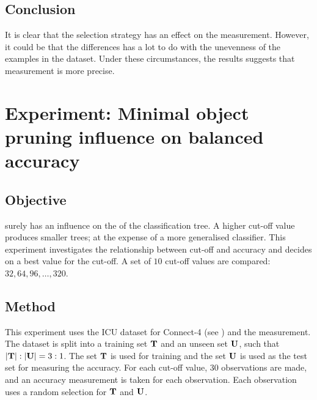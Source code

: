
\subsection{Conclusion}
It is clear that the selection strategy has an effect on the measurement.  However, it could be that the differences has a lot to do with the unevenness of the examples in the dataset. Under these circumstances, the results suggests that  measurement is more precise.   

\section{Experiment: Minimal object pruning influence on balanced accuracy}
\subsection{Objective}
 surely has an influence on the  of the classification tree.    A higher cut-off value produces smaller trees; at the expense of a more generalised classifier. This experiment investigates the relationship between cut-off and accuracy and decides on a best value for the cut-off. A set of $10$ cut-off values are compared: $32, 64, 96, \ldots, 320$.
\subsection{Method}
This experiment uses the ICU dataset for Connect-4 (see ) and the  measurement.  The dataset is split into a training set ${\bf T}$ and an unseen set ${\bf U}$, such that $|{\bf T}|:|{\bf U}| = 3:1$.  The set ${\bf T}$ is used for training and the set ${\bf U}$ is used as the test set for measuring the accuracy.   
For each cut-off value, $30$ observations are made, and an accuracy measurement is taken for each observation.  Each observation uses a random selection for ${\bf T}$ and ${\bf U}$.   
